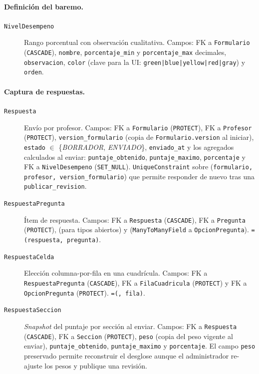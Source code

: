 \paragraph{Definición del baremo.}
\begin{description}
    \item[\texttt{NivelDesempeno}] Rango porcentual con observación cualitativa. Campos: FK a \texttt{Formulario} (\texttt{CASCADE}), \texttt{nombre}, \texttt{porcentaje\_min} y \texttt{porcentaje\_max} decimales, \texttt{observacion}, \texttt{color} (clave para la UI: \texttt{green|blue|yellow|red|gray}) y \texttt{orden}.
\end{description}

\paragraph{Captura de respuestas.}
\begin{description}
    \item[\texttt{Respuesta}] Envío por profesor. Campos: FK a \texttt{Formulario} (\texttt{PROTECT}), FK a \texttt{Profesor} (\texttt{PROTECT}), \texttt{version\_formulario} (copia de \texttt{Formulario.version} al iniciar), \texttt{estado} $\in$ \{\emph{BORRADOR}, \emph{ENVIADO}\}, \texttt{enviado\_at} y los agregados calculados al enviar: \texttt{puntaje\_obtenido}, \texttt{puntaje\_maximo}, \texttt{porcentaje} y FK a \texttt{NivelDesempeno} (\texttt{SET\_NULL}). \texttt{UniqueConstraint} sobre (\texttt{formulario, profesor, version\_formulario}) que permite responder de nuevo tras una \texttt{publicar\_revision}.
    \item[\texttt{RespuestaPregunta}] Ítem de respuesta. Campos: FK a \texttt{Respuesta} (\texttt{CASCADE}), FK a \texttt{Pregunta} (\texttt{PROTECT}),  (para tipos abiertos) y  (\texttt{ManyToManyField} a \texttt{OpcionPregunta}). \texttt{=(respuesta, pregunta)}.
    \item[\texttt{RespuestaCelda}] Elección columna-por-fila en una cuadrícula. Campos: FK a \texttt{RespuestaPregunta} (\texttt{CASCADE}), FK a \texttt{FilaCuadricula} (\texttt{PROTECT}) y FK a \texttt{OpcionPregunta} (\texttt{PROTECT}). \texttt{=(}\texttt{, fila)}.
    \item[\texttt{RespuestaSeccion}] \emph{Snapshot} del puntaje por sección al enviar. Campos: FK a \texttt{Respuesta} (\texttt{CASCADE}), FK a \texttt{Seccion} (\texttt{PROTECT}), \texttt{peso} (copia del peso vigente al enviar), \texttt{puntaje\_obtenido}, \texttt{puntaje\_maximo} y \texttt{porcentaje}. El campo \texttt{peso} preservado permite reconstruir el desglose aunque el administrador re-ajuste los pesos y publique una revisión.
\end{description}

